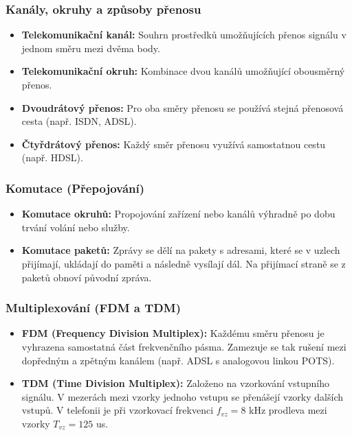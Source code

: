     \subsubsection{Kanály, okruhy a způsoby přenosu}
        \begin{itemize}
            \item \textbf{Telekomunikační kanál:} Souhrn prostředků umožňujících přenos signálu v jednom směru mezi dvěma body.
            \item \textbf{Telekomunikační okruh:} Kombinace dvou kanálů umožňující obousměrný přenos.
            \item \textbf{Dvoudrátový přenos:} Pro oba směry přenosu se používá stejná přenosová cesta (např. ISDN, ADSL).
            \item \textbf{Čtyřdrátový přenos:} Každý směr přenosu využívá samostatnou cestu (např. HDSL).
        \end{itemize}
    \subsubsection{Komutace (Přepojování)}
        \begin{itemize}
            \item \textbf{Komutace okruhů:} Propojování zařízení nebo kanálů výhradně po dobu trvání volání nebo služby.
            \item \textbf{Komutace paketů:} Zprávy se dělí na pakety s adresami, které se v uzlech přijímají, ukládají do paměti a následně vysílají dál. Na přijímací straně se z paketů obnoví původní zpráva.
        \end{itemize}
        \subsubsection{Multiplexování (FDM a TDM)}
        \begin{itemize}
            \item \textbf{FDM (Frequency Division Multiplex):} Každému směru přenosu je vyhrazena samostatná část frekvenčního pásma. Zamezuje se tak rušení mezi dopředným a zpětným kanálem (např. ADSL s analogovou linkou POTS).
            \item \textbf{TDM (Time Division Multiplex):} Založeno na vzorkování vstupního signálu. V mezerách mezi vzorky jednoho vstupu se přenášejí vzorky dalších vstupů. V telefonii je při vzorkovací frekvenci $f_{vz} = 8$ kHz prodleva mezi vzorky $T_{vz} = 125$ us.
        \end{itemize}
